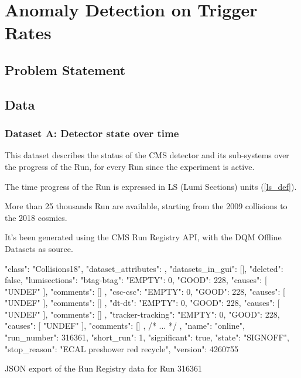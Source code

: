 \chapter{Anomaly Detection on Trigger Rates}

\section{Problem Statement}

\section{Data}

\subsection{Dataset A: Detector state over time}

This dataset describes the status of the CMS detector and its sub-systems over the progress of the Run, for every Run since the experiment is active.

The time progress of the Run is expressed in LS (Lumi Sections) units (\ref{ls_def}).

More than 25 thousands Run are available, starting from the 2009 collisions to the 2018 cosmics.

It's been generated using the CMS Run Registry API, with the DQM Offline Datasets as source.

\begin{listing}[H]
\begin{jsoncode}
  {
    "class": "Collisions18",
    "dataset_attributes": {},
    "datasets_in_gui": [],
    "deleted": false,
    "lumisections": {
      "btag-btag": {
        "EMPTY": 0,
        "GOOD": 228,
        "causes": [
          "UNDEF"
        ],
        "comments": []
      },
      "csc-csc": {
        "EMPTY": 0,
        "GOOD": 228,
        "causes": [
          "UNDEF"
        ],
        "comments": []
      },
      "dt-dt": {
        "EMPTY": 0,
        "GOOD": 228,
        "causes": [
          "UNDEF"
        ],
        "comments": []
      },
      "tracker-tracking": {
        "EMPTY": 0,
        "GOOD": 228,
        "causes": [
          "UNDEF"
        ],
        "comments": []
      },
      /* ... */
    },
    "name": "online",
    "run_number": 316361,
    "short_run": 1,
    "significant": true,
    "state": "SIGNOFF",
    "stop_reason": "ECAL preshower red recycle",
    "version": 4260755
  }
\end{jsoncode}
\caption{JSON export of the Run Registry data for Run 316361}
\end{listing}

